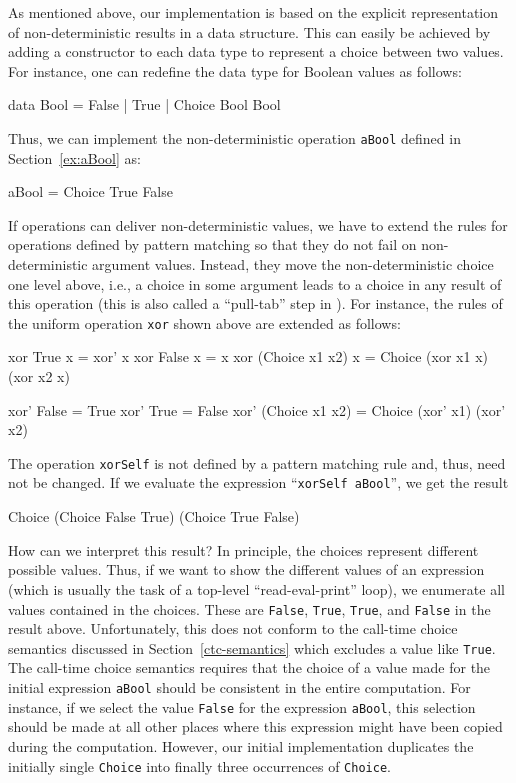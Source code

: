 \documentclass{llncs}
\newcommand{\code}[1]{\mbox{\small\texttt{#1}}}
\newcommand{\ccode}[1]{``\code{#1}''}
\begin{document}
As mentioned above, our implementation is based on the explicit
representation of non-deterministic results in a data structure.
This can easily be achieved by adding a constructor
to each data type to represent a choice between two values.
For instance, one can redefine the data type for Boolean values
as follows:
\begin{haskell}
  data Bool = False | True | Choice Bool Bool
\end{haskell}
Thus, we can implement the non-deterministic operation \code{aBool}
defined in Section~\ref{ex:aBool} as:
\begin{haskell}
  aBool = Choice True False
\end{haskell}
If operations can deliver non-deterministic values,
we have to extend the rules for operations defined by
pattern matching so that they do not fail on non-deterministic argument
values. Instead, they move the non-deterministic choice one level above,
i.e., a choice in some argument leads to a choice in any result
of this operation (this is also called a ``pull-tab'' step in
\cite{AlqaddoumiAntoyFischerReck10}). For instance,
the rules of the uniform operation \code{xor} shown above
are extended as follows:
%
\begin{haskell}
  xor True           x = xor' x
  xor False          x = x
  xor (Choice x1 x2) x = Choice (xor x1 x) (xor x2 x)

  xor' False          = True
  xor' True           = False
  xor' (Choice x1 x2) = Choice (xor' x1) (xor' x2)
\end{haskell}
%
The operation \code{xorSelf} is not defined by a pattern matching rule
and, thus, need not be changed.
If we evaluate the expression \ccode{xorSelf aBool}, we get the result
\begin{haskell}
  Choice (Choice False True) (Choice True False)
\end{haskell}
How can we interpret this result?
In principle, the choices represent different possible values.
Thus, if we want to show the different values of an expression
(which is usually the task of a top-level ``read-eval-print'' loop),
we enumerate all values contained in the choices.
These are \code{False}, \code{True}, \code{True}, and \code{False}
in the result above.
Unfortunately, this does not conform to the call-time choice semantics
discussed in Section~\ref{ctc-semantics} which excludes
a value like \code{True}.
The call-time choice semantics requires that the choice
of a value made for
the initial expression \code{aBool} should be consistent
in the entire computation.
For instance, if we select the value \code{False} for the
expression \code{aBool}, this selection should be made
at all other places where this expression might have been copied
during the computation. However, our initial implementation
duplicates the initially single \code{Choice} into finally three
occurrences of \code{Choice}.
\end{document}
